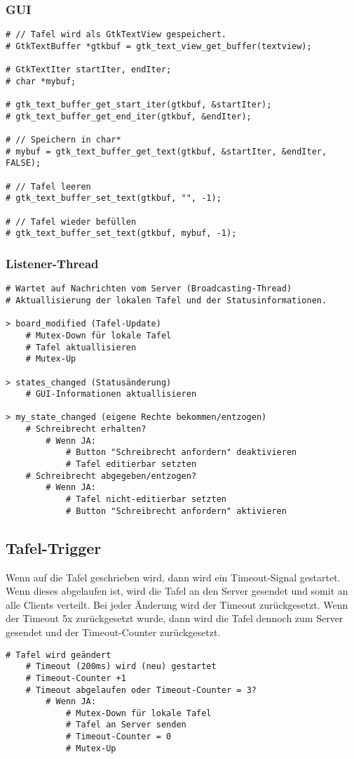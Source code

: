 \subsubsection{GUI}
\begin{lstlisting}
# // Tafel wird als GtkTextView gespeichert.
# GtkTextBuffer *gtkbuf = gtk_text_view_get_buffer(textview);

# GtkTextIter startIter, endIter;
# char *mybuf;

# gtk_text_buffer_get_start_iter(gtkbuf, &startIter);
# gtk_text_buffer_get_end_iter(gtkbuf, &endIter);

# // Speichern in char*
# mybuf = gtk_text_buffer_get_text(gtkbuf, &startIter, &endIter, FALSE);

# // Tafel leeren
# gtk_text_buffer_set_text(gtkbuf, "", -1);

# // Tafel wieder befüllen
# gtk_text_buffer_set_text(gtkbuf, mybuf, -1);
\end{lstlisting}

\subsubsection{Listener-Thread}
\begin{lstlisting}
# Wartet auf Nachrichten vom Server (Broadcasting-Thread)
# Aktuallisierung der lokalen Tafel und der Statusinformationen.

> board_modified (Tafel-Update)
    # Mutex-Down für lokale Tafel
    # Tafel aktuallisieren
    # Mutex-Up

> states_changed (Statusänderung)
    # GUI-Informationen aktuallisieren

> my_state_changed (eigene Rechte bekommen/entzogen)
    # Schreibrecht erhalten?
        # Wenn JA:
            # Button "Schreibrecht anfordern" deaktivieren
            # Tafel editierbar setzten
    # Schreibrecht abgegeben/entzogen?
        # Wenn JA:
            # Tafel nicht-editierbar setzten
            # Button "Schreibrecht anfordern" aktivieren
\end{lstlisting}

\subsection{Tafel-Trigger}
Wenn auf die Tafel geschrieben wird, dann wird ein Timeout-Signal gestartet. Wenn dieses abgelaufen ist, wird die Tafel an den Server gesendet und somit an alle Clients verteilt.
Bei jeder Änderung wird der Timeout zurückgesetzt. Wenn der Timeout 5x zurückgesetzt wurde, dann wird die Tafel dennoch zum Server gesendet und der Timeout-Counter zurückgesetzt.
\begin{lstlisting}
# Tafel wird geändert
    # Timeout (200ms) wird (neu) gestartet
    # Timeout-Counter +1
    # Timeout abgelaufen oder Timeout-Counter = 3?
        # Wenn JA:
            # Mutex-Down für lokale Tafel
            # Tafel an Server senden
            # Timeout-Counter = 0
            # Mutex-Up
\end{lstlisting}
